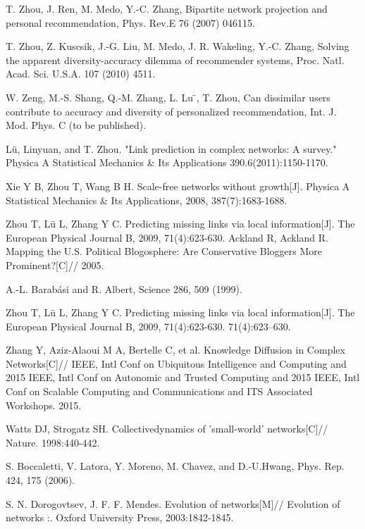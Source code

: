 \documentclass[onecolumn,preprintnumbers,amsmath,amssymb]{revtex4}
\begin{document}
\begin{thebibliography}{00}
T. Zhou, J. Ren, M. Medo, Y.-C. Zhang, Bipartite network projection and personal recommendation, Phys. Rev.E 76 (2007) 046115.

T. Zhou, Z. Kuscsik, J.-G. Liu, M. Medo, J. R. Wakeling, Y.-C. Zhang, Solving the apparent diversity-accuracy dilemma of recommender systems, Proc. Natl. Acad. Sci. U.S.A. 107 (2010) 4511.

W. Zeng, M.-S. Shang, Q.-M. Zhang, L. Lu ̈, T. Zhou, Can dissimilar users contribute to accuracy and diversity of personalized recommendation, Int. J. Mod. Phys. C (to be published).

Lü, Linyuan, and T. Zhou. "Link prediction in complex networks: A survey." Physica A Statistical Mechanics \& Its Applications 390.6(2011):1150-1170.


Xie Y B, Zhou T, Wang B H. Scale-free networks without growth[J]. Physica A Statistical Mechanics \& Its Applications, 2008, 387(7):1683-1688.

Zhou T, Lü L, Zhang Y C. Predicting missing links via local information[J]. The European Physical Journal B, 2009, 71(4):623-630.
Ackland R, Ackland R. Mapping the U.S. Political Blogosphere: Are Conservative Bloggers More Prominent?[C]// 2005.

A.-L. Barabási and R. Albert, Science 286, 509 (1999).

Zhou T, Lü L, Zhang Y C. Predicting missing links via local information[J]. The European Physical Journal B, 2009, 71(4):623-630.
71(4):623–630. 

Zhang Y, Aziz-Alaoui M A, Bertelle C, et al. Knowledge Diffusion in Complex Networks[C]// IEEE, Intl Conf on Ubiquitous Intelligence and Computing and 2015 IEEE, Intl Conf on Autonomic and Trusted Computing and 2015 IEEE, Intl Conf on Scalable Computing and Communications and ITS Associated Workshops. 2015.

Watts DJ, Strogatz SH. Collectivedynamics of ’small-world’ networks[C]// Nature. 1998:440-442.

S. Boccaletti, V. Latora, Y. Moreno, M. Chavez, and D.-U.Hwang, Phys. Rep. 424, 175 (2006).

S. N. Dorogovtsev, J. F. F. Mendes. Evolution of networks[M]// Evolution of networks :. Oxford University Press, 2003:1842-1845.


\end{thebibliography}
\end{document}

